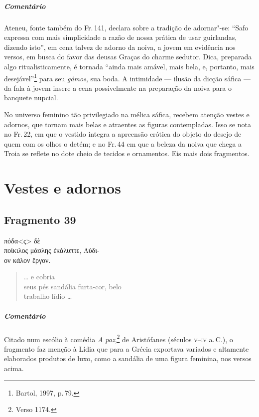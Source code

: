 \medskip

{\paragraph{Comentário} Ateneu, fonte também do Fr.\,141, declara sobre a tradição de adornar"-se:
``Safo expressa com mais simplicidade a razão de nossa prática
de usar guirlandas, dizendo isto'', em cena talvez de adorno da noiva, a jovem em evidência nos versos, em busca do favor das deusas Graças do charme sedutor.
Dica, preparada algo ritualisticamente, é tornada ``ainda mais amável, mais bela, e, portanto, mais desejável''\footnote{Bartol, 1997, p.\,79.} para seu \emph{gámos}, sua boda. A intimidade --- ilusão da dicção sáfica --- da fala à jovem insere a cena possivelmente na preparação da noiva para o banquete nupcial.}

\begin{argumento}
No universo feminino tão privilegiado na mélica sáfica, recebem atenção vestes e
adornos, que tornam mais belas e atraentes as figuras contempladas. Isso se
nota no Fr.\,22, em que o vestido integra a apreensão erótica do objeto do
desejo de quem com os olhos o detém; e no Fr.\,44 em que a beleza da noiva que chega a
Troia se reflete no dote cheio de tecidos e ornamentos. Eis mais dois fragmentos.
\end{argumento}


\chapter{Vestes e adornos}


\section{Fragmento 39}

\begin{gkverse}
πόδα<ς> δὲ\\
ποίκιλος μάσλης ἐκάλυπτε, Λύδι-\\
ον κάλον ἔργον.
\end{gkverse}

\begin{verse}
\ldots{} e cobria\\
seus pés sandália furta-cor, belo\\
trabalho lídio \ldots{}
\end{verse}

\medskip

{\paragraph{Comentário} Citado num escólio à comédia \emph{A paz},\footnote{Verso 1174.} 
de Aristófanes (séculos \textsc{v}--\textsc{iv} a.\,C.),
o fragmento faz menção à Lídia que para a Grécia exportava variados e altamente
elaborados produtos de luxo, como a sandália de uma figura feminina, nos versos acima.}

